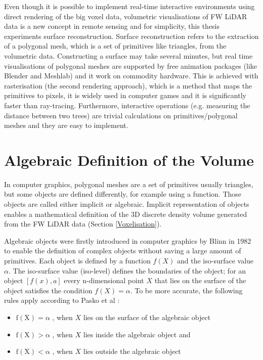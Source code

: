 \documentclass{subfiles}
\begin{document}
\par Even though it is possible to implement real-time interactive environments using direct rendering of the big voxel data, volumetric visualisations of FW LiDAR data is a new concept in remote sensing and for simplicity, this thesis experiments surface reconstruction. Surface reconstruction refers to the extraction of a polygonal mesh, which is a set of primitives like triangles, from the volumetric data. Constructing a surface may take several minutes, but real time visualisations of polygonal meshes are supported by free animation packages (like Blender and Meshlab) and it work on commodity hardware. This is achieved with rasterisation  (the second rendering approach), which is a method that maps the primitives to pixels, it is widely used in computer games and it is significantly faster than ray-tracing. Furthermore, interactive operations (e.g. measuring the distance between two trees) are trivial calculations on primitives/polygonal meshes and they are easy to implement. 



\section{Algebraic Definition of the Volume}\label{sec:AlgebracObjects}

In computer graphics, polygonal meshes are a set of primitives usually triangles, but some objects are defined differently, for example using a function. Those objects are called either implicit or algebraic. Implicit representation of objects enables a mathematical definition of the 3D discrete density volume generated from the FW LiDAR data (Section \ref{Voxelisation}). 

\par Algebraic objects were firstly introduced in computer graphics by Blinn in 1982 \cite{Blinn1982} to enable the definition of complex objects without saving a large amount of primitives. Each object is defined by a function $ \mathit{f(X)} $ and the iso-surface value $\alpha$. The iso-surface value (iso-level) defines the boundaries of the object; for an object $ [f(x),a]$ every n-dimensional point $ \mathit{X} $  that lies on the surface of the object satisfies the condition $ \mathit{f(X)=\alpha }  $. To be more accurate, the following rules apply according to Pasko et al \cite{Pasko1994}: 
\begin{itemize}
	\item $	\mathrm{f(X) = \alpha }$ , when $X$ lies on the surface of the algebraic object
	\item $	\mathrm{f(X) > \alpha }$ , when $X$ lies inside the algebraic object and
	\item $	\mathrm{f(X) < \alpha }$ , when $X$ lies outside the algebraic object	 
\end{itemize}
\end{document}

